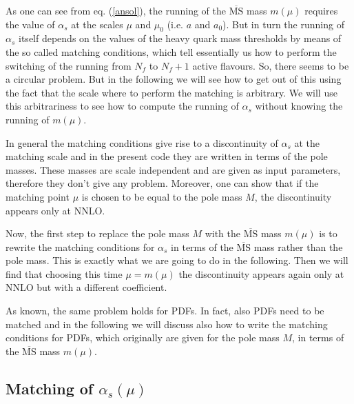\documentclass[10pt,a4paper]{article}
\begin{document}
As one can see from eq. (\ref{ansol}), the running of the $\overline{\mbox{MS}}$ mass $m(\mu)$ requires the value of $\alpha_s$ at the scales $\mu$ and $\mu_0$ (i.e. $a$ and $a_0$). But in turn the running of $\alpha_s$ itself depends on the values of the heavy quark mass thresholds by means of the so called matching conditions, which tell essentially us how to perform the switching of the running from $N_f$ to $N_f+1$ active flavours. So, there seems to be a circular problem. But in the following we will see how to get out of this using the fact that the scale where to perform the matching is arbitrary. We will use this arbitrariness to see how to compute the running of $\alpha_s$ without knowing the running of $m(\mu)$.

In general the matching conditions give rise to a discontinuity of $\alpha_s$ at the matching scale and in the present code they are written in terms of the pole masses. These masses are scale independent and are given as input parameters, therefore they don't give any problem. Moreover, one can show that if the matching point $\mu$ is chosen to be equal to the pole mass $M$, the discontinuity appears only at NNLO.

Now, the first step to replace the pole mass $M$ with the $\overline{\mbox{MS}}$ mass $m(\mu)$ is to rewrite the matching conditions for $\alpha_s$ in terms of the $\overline{\mbox{MS}}$ mass rather than the pole mass. This is exactly what we are going to do in the following. Then we will find that choosing this time $\mu=m(\mu)$ the discontinuity appears again only at NNLO but with a different coefficient.

As known, the same problem holds for PDFs. In fact, also PDFs need to be matched and in the following we will discuss also how to write the matching conditions for PDFs, which originally are given for the pole mass $M$, in terms of the $\overline{\mbox{MS}}$ mass $m(\mu)$.

\subsection{Matching of $\alpha_s(\mu)$}
\end{document}
